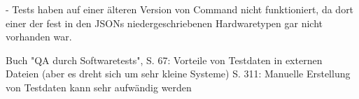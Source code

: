 - Tests haben auf einer älteren Version von Command nicht funktioniert, da dort einer der fest in den JSONs niedergeschriebenen Hardwaretypen gar nicht vorhanden war. 

Buch "QA durch Softwaretests", S. 67: Vorteile von Testdaten in externen Dateien (aber es dreht sich um sehr kleine Systeme)
S. 311: Manuelle Erstellung von Testdaten kann sehr aufwändig werden